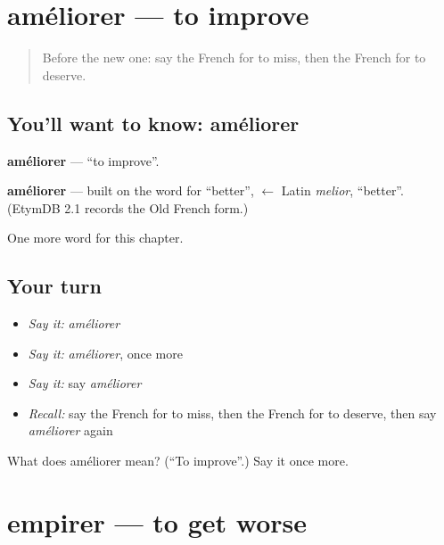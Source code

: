 \section[améliorer]{améliorer — to improve}

\label{lesson:FR-C237-ameliorer}



\begin{quote}
Before the new one: say the French for to miss, then the French for to deserve.
\end{quote}

\subsection*{You'll want to know: améliorer}
\textbf{améliorer} — \textquotedblleft{}to improve\textquotedblright{}.

\begin{cousinweb}
\textbf{améliorer} — built on the word for \textquotedblleft{}better\textquotedblright{}, $\leftarrow$ Latin \emph{melior}, \textquotedblleft{}better\textquotedblright{}. (EtymDB 2.1 records the Old French form.)
\end{cousinweb}

\begin{grammarlens}[title={What you've built}]
One more word for this chapter.
\end{grammarlens}

\subsection*{Your turn}
\begin{itemize}
\raggedright
  \item \emph{Say it:} \emph{améliorer}
  \item \emph{Say it:} \emph{améliorer}, once more
  \item \emph{Say it:} say \emph{améliorer}
  \item \emph{Recall:} say the French for to miss, then the French for to deserve, then say \emph{améliorer} again
\end{itemize}

\begin{tcolorbox}[breakable,colback=teal!4,colframe=teal!35!black,title={Before you move on}]
What does améliorer mean? (\textquotedblleft{}To improve\textquotedblright{}.) Say it once more.
\end{tcolorbox}
\section[empirer]{empirer — to get worse}

